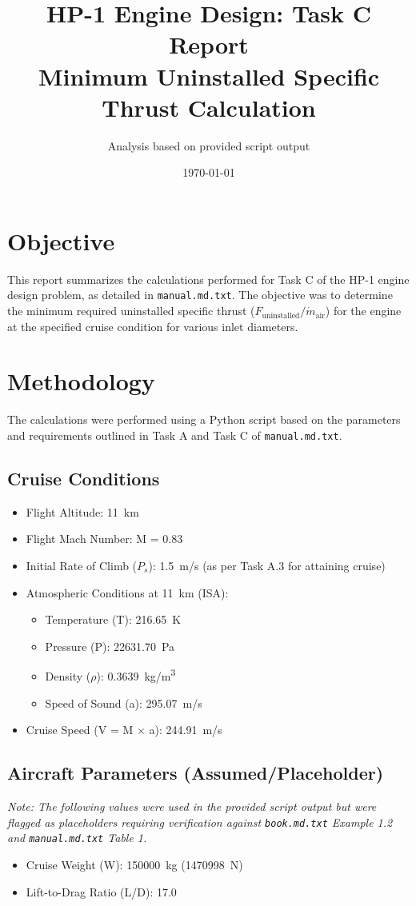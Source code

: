 \documentclass{article}
\title{HP-1 Engine Design: Task C Report \\ Minimum Uninstalled Specific Thrust Calculation}
\author{Analysis based on provided script output}
\date{\today} %
\begin{document}
\maketitle

\section{Objective}

This report summarizes the calculations performed for Task C of the HP-1 engine design problem, as detailed in \texttt{manual.md.txt}. The objective was to determine the minimum required uninstalled specific thrust ($F_{\text{uninstalled}}/\dot{m}_{\text{air}}$) for the engine at the specified cruise condition for various inlet diameters.

\section{Methodology}

The calculations were performed using a Python script based on the parameters and requirements outlined in Task A and Task C of \texttt{manual.md.txt}.

\subsection{Cruise Conditions}
\begin{itemize}
    \item Flight Altitude: \SI{11}{km}
    \item Flight Mach Number: M = 0.83
    \item Initial Rate of Climb ($P_s$): \SI{1.5}{m/s} (as per Task A.3 for attaining cruise)
    \item Atmospheric Conditions at \SI{11}{km} (ISA):
        \begin{itemize}
            \item Temperature (T): \SI{216.65}{K}
            \item Pressure (P): \SI{22631.70}{Pa}
            \item Density ($\rho$): \SI{0.3639}{kg/m^3}
            \item Speed of Sound (a): \SI{295.07}{m/s}
        \end{itemize}
    \item Cruise Speed (V = M $\times$ a): \SI{244.91}{m/s}
\end{itemize}

\subsection{Aircraft Parameters (Assumed/Placeholder)}
\textit{Note: The following values were used in the provided script output but were flagged as placeholders requiring verification against \texttt{book.md.txt} Example 1.2 and \texttt{manual.md.txt} Table 1.}
\begin{itemize}
    \item Cruise Weight (W): \SI{150000}{kg} (\SI{1470998}{N})
    \item Lift-to-Drag Ratio (L/D): 17.0
\end{itemize}
\end{document}
